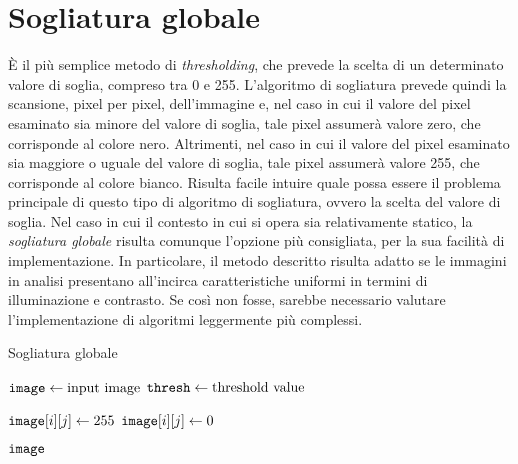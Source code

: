 \section{Sogliatura globale}
\`E il pi\`u semplice metodo di \textit{thresholding}, che prevede la scelta di un determinato valore di soglia, compreso tra 0 e 255. L'algoritmo di sogliatura prevede quindi la scansione, pixel per pixel, dell'immagine e, nel caso in cui il valore del pixel esaminato sia minore del valore di soglia, tale pixel assumer\`a valore zero, che corrisponde al colore nero. Altrimenti, nel caso in cui il valore del pixel esaminato sia maggiore o uguale del valore di soglia, tale pixel assumer\`a valore 255, che corrisponde al colore bianco. Risulta facile intuire quale possa essere il problema principale di questo tipo di algoritmo di sogliatura, ovvero la scelta del valore di soglia.
Nel caso in cui il contesto in cui si opera sia relativamente statico, la \textit{sogliatura globale} risulta comunque l'opzione pi\`u consigliata, per la sua facilit\`a di implementazione. In particolare, il metodo descritto risulta adatto se le immagini in analisi presentano all'incirca caratteristiche uniformi in termini di illuminazione e contrasto. Se cos\`i non fosse, sarebbe necessario valutare l'implementazione di algoritmi leggermente pi\`u complessi.
\begin{algorithm}
	\caption{Sogliatura globale}
	\label{alg:thresh-global}
	\begin{algorithmic}[1]
			\State $\texttt{image} \gets \text{input image}$
			\State $\texttt{thresh} \gets \text{threshold value}$
			
						\State $\texttt{image}[i][j] \gets 255$
					\Else
						\State $\texttt{image}[i][j] \gets 0$
					\EndIf
				\EndFor
			\EndFor

			\Return $\texttt{image}$
		\EndFunction
	\end{algorithmic}
\end{algorithm}


